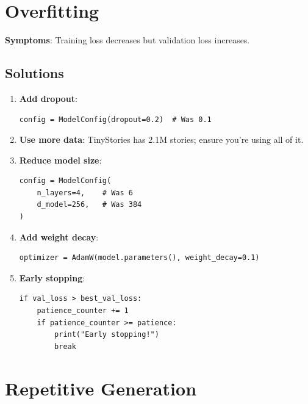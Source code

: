 \section{Overfitting}

\textbf{Symptoms}: Training loss decreases but validation loss increases.

\subsection{Solutions}

\begin{enumerate}
    \item \textbf{Add dropout}:
    \begin{lstlisting}[style=python]
config = ModelConfig(dropout=0.2)  # Was 0.1
    \end{lstlisting}

    \item \textbf{Use more data}: TinyStories has 2.1M stories; ensure you're using all of it.

    \item \textbf{Reduce model size}:
    \begin{lstlisting}[style=python]
config = ModelConfig(
    n_layers=4,    # Was 6
    d_model=256,   # Was 384
)
    \end{lstlisting}

    \item \textbf{Add weight decay}:
    \begin{lstlisting}[style=python]
optimizer = AdamW(model.parameters(), weight_decay=0.1)
    \end{lstlisting}

    \item \textbf{Early stopping}:
    \begin{lstlisting}[style=python]
if val_loss > best_val_loss:
    patience_counter += 1
    if patience_counter >= patience:
        print("Early stopping!")
        break
    \end{lstlisting}
\end{enumerate}

\section{Repetitive Generation}

